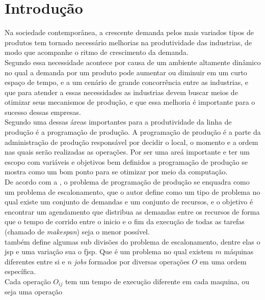 \chapter{Introdução}

Na sociedade contemporânea, a crescente demanda pelos mais variados tipos de produtos tem tornado necessário melhorias na produtividade das industrias, de modo que acompanhe o ritmo de crescimento da demanda.\\
\indent Segundo \citeauthor{Wari2016} essa necessidade acontece por causa de um ambiente altamente dinâmico no qual a demanda por um produto pode aumentar ou diminuir em um curto espaço de tempo, e a um cenário de grande concorrência entre as industrias, e que para atender a essas necessidades as industrias devem buscar meios de otimizar seus mecanismos de produção, e que essa melhoria é importante para o sucesso dessas empresas.\\
\indent Segundo \citeauthor{Xhafa2008} uma dessas áreas importantes para a produtividade da linha de produção é a programação de produção. 
A programação de produção é a parte da administração de produção responsável por decidir o local, o momento e a ordem nas quais serão realizadas as operações. 
Por ser uma areá importante e ter um escopo com variáveis e objetivos bem definidos a programação de produção se mostra como um bom ponto para se otimizar por meio da computação.\\
\indent De acordo com a \citeauthor{Bagchi1999}, o problema de programação de produção se enquadra como um problema de escalonamento, que o autor define como um tipo de problema no qual existe um conjunto de demandas e um conjunto de recursos, e o objetivo é encontrar um agendamento que distribua as demandas entre os recursos de forma que o tempo de corrido entre o inicio e o fim da execução de todas as tarefas (chamado de \textit{makespan}) seja o menor possível.\\
\indent \citeauthor{Bagchi1999} também define algumas sub divisões do problema de escalonamento, dentre elas o \gls{jsp} e uma variação sua o \gls{fjsp}. 
Que é um problema no qual existem $m$ máquinas diferentes entre si e $n$ \textit{jobs} formados por diversas operações $O$ em uma ordem específica.\\
Cada operação $O_{ij}$ tem um tempo de execução diferente em cada maquina, ou seja uma operação 
